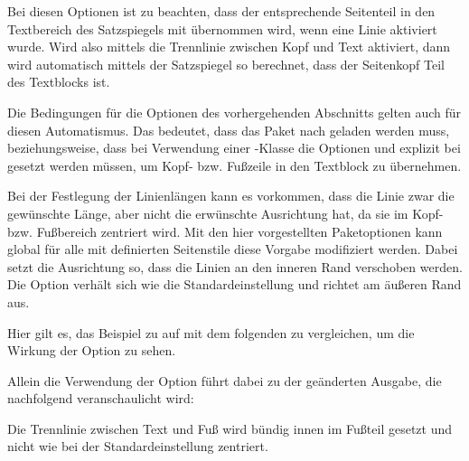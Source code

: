 Bei diesen Optionen ist zu beachten, dass der entsprechende Seitenteil in den
Textbereich des Satzspiegels mit übernommen wird, wenn eine Linie aktiviert
wurde.  Wird also mittels  die Trennlinie zwischen Kopf
und Text aktiviert, dann wird automatisch mittels  der
Satzspiegel so berechnet, dass der Seitenkopf Teil des Textblocks ist.

Die Bedingungen für die Optionen des vorhergehenden
Abschnitts gelten auch für diesen Automatismus.  Das bedeutet, dass das Paket
 nach  geladen werden muss,
beziehungsweise, dass bei Verwendung einer \KOMAScript{}-Klasse die Optionen
 und  explizit bei
 gesetzt werden müssen, um Kopf- bzw. Fußzeile in den
Textblock zu übernehmen.%
%
\EndIndexGroup


\begin{Declaration}
\end{Declaration}%
%
Bei der Festlegung der Linienlängen kann es vorkommen, dass die Linie zwar die
gewünschte Länge, aber nicht die erwünschte Ausrichtung hat, da sie im Kopf-
bzw. Fußbereich zentriert wird. Mit den hier vorgestellten Paketoptionen kann
global für alle mit  definierten Seitenstile diese Vorgabe
modifiziert werden.  Dabei setzt  die Ausrichtung so, dass die
Linien an den inneren Rand verschoben werden. Die Option 
verhält sich wie die Standardeinstellung und  richtet am
äußeren Rand aus.

\begin{Example}
  Hier gilt es, das Beispiel zu  auf
   mit dem folgenden zu
  vergleichen, um die Wirkung der Option  zu sehen.
\begin{lstcode}
  \usepackage[ilines,footsepline,footbotline]
             {scrpage2}
  \setfootbotline{2pt}  
  \setfootsepline[text]{.4pt}
\end{lstcode}
  Allein die Verwendung der Option  führt dabei zu der
  geänderten Ausgabe, die nachfolgend veranschaulicht wird:
%
\begin{XmpBotPage}
        \thinlines{}
        \thicklines{}
\end{XmpBotPage}
  Die Trennlinie zwischen Text und Fuß wird bündig innen im Fußteil
  gesetzt und nicht wie bei der Standardeinstellung zentriert.
\end{Example}
\EndIndexGroup


